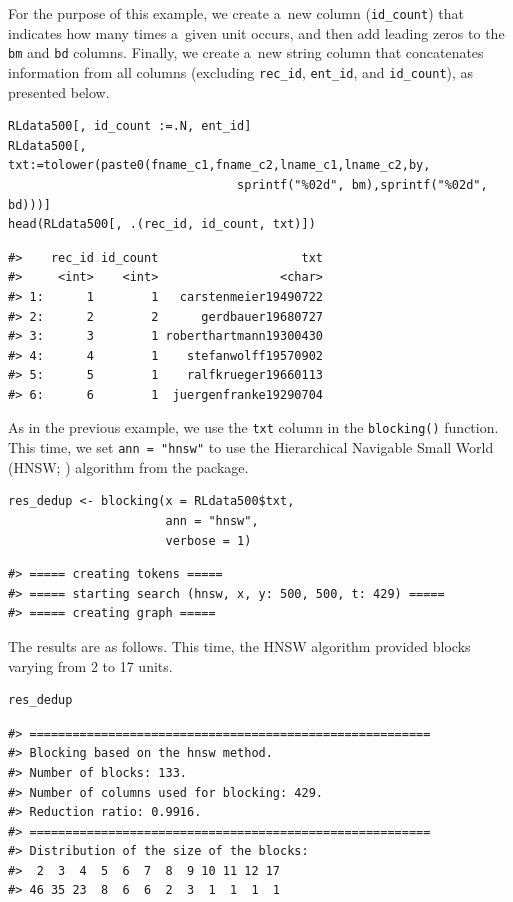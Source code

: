 For the purpose of this example, we create a~new column (\texttt{id\_count})
that indicates how many times a~given unit occurs, and then add leading
zeros to the \texttt{bm} and \texttt{bd} columns. Finally, we create a~new string
column that concatenates information from all columns (excluding
\texttt{rec\_id}, \texttt{ent\_id}, and \texttt{id\_count}), as presented below.

\begin{verbatim}
RLdata500[, id_count :=.N, ent_id]
RLdata500[, txt:=tolower(paste0(fname_c1,fname_c2,lname_c1,lname_c2,by,
                                sprintf("%02d", bm),sprintf("%02d", bd)))]
head(RLdata500[, .(rec_id, id_count, txt)])
\end{verbatim}

\begin{verbatim}
#>    rec_id id_count                    txt
#>     <int>    <int>                 <char>
#> 1:      1        1   carstenmeier19490722
#> 2:      2        2      gerdbauer19680727
#> 3:      3        1 roberthartmann19300430
#> 4:      4        1    stefanwolff19570902
#> 5:      5        1    ralfkrueger19660113
#> 6:      6        1  juergenfranke19290704
\end{verbatim}

As in the previous example, we use the \texttt{txt} column in the \texttt{blocking()}
function. This time, we set \texttt{ann\ =\ "hnsw"} to use the Hierarchical
Navigable Small World (HNSW; \citet{malkov2018efficient}) algorithm from the
 package.

\begin{verbatim}
res_dedup <- blocking(x = RLdata500$txt,
                      ann = "hnsw",
                      verbose = 1)
\end{verbatim}

\begin{verbatim}
#> ===== creating tokens =====
#> ===== starting search (hnsw, x, y: 500, 500, t: 429) =====
#> ===== creating graph =====
\end{verbatim}

The results are as follows. This time, the HNSW algorithm provided
blocks varying from 2 to 17 units.


\begin{verbatim}
res_dedup
\end{verbatim}

\begin{verbatim}
#> ========================================================
#> Blocking based on the hnsw method.
#> Number of blocks: 133.
#> Number of columns used for blocking: 429.
#> Reduction ratio: 0.9916.
#> ========================================================
#> Distribution of the size of the blocks:
#>  2  3  4  5  6  7  8  9 10 11 12 17 
#> 46 35 23  8  6  6  2  3  1  1  1  1
\end{verbatim}

